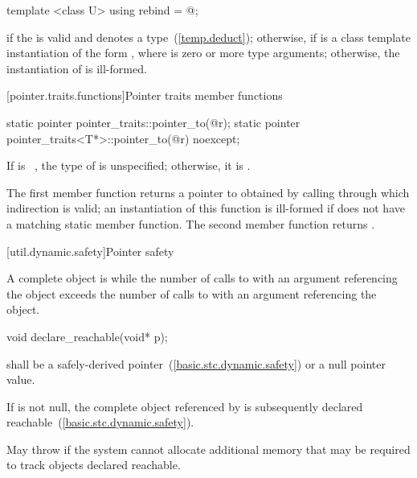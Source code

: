 %
\begin{itemdecl}
template <class U> using rebind = @\seebelow@;
\end{itemdecl}

\begin{itemdescr}
\pnum
\templalias {} if
the   is valid and denotes a
type~(\ref{temp.deduct}); otherwise,
 if
 is a class template instantiation of the form ,
where  is zero or more type arguments; otherwise, the instantiation of
 is ill-formed.
\end{itemdescr}

[pointer.traits.functions]{Pointer traits member functions}

%
\begin{itemdecl}
static pointer pointer_traits::pointer_to(@\seebelow@ r);
static pointer pointer_traits<T*>::pointer_to(@\seebelow@ r) noexcept;
\end{itemdecl}

\begin{itemdescr}
\pnum
\remarks If  is \cv{}~, the type of
 is unspecified; otherwise, it is .

\pnum
\returns The first member function returns a pointer to 
obtained by calling  through which
indirection is valid; an instantiation of this function is
ill-formed if  does not have a matching  static member
function. The second member function returns .
\end{itemdescr}

[util.dynamic.safety]{Pointer safety}

\pnum
A complete object is  while the number of calls to
 with an argument referencing the object exceeds the
number of calls to  with an argument referencing the
object.

%
\begin{itemdecl}
void declare_reachable(void* p);
\end{itemdecl}

\begin{itemdescr}
\pnum
\requires {} shall be a safely-derived
pointer~(\ref{basic.stc.dynamic.safety}) or a null pointer value.

\pnum
\effects If  is not null, the complete object referenced by 
is subsequently declared reachable~(\ref{basic.stc.dynamic.safety}).

\pnum
\throws May throw  if the system cannot allocate
additional memory that may be required to track objects declared reachable.
\end{itemdescr}

